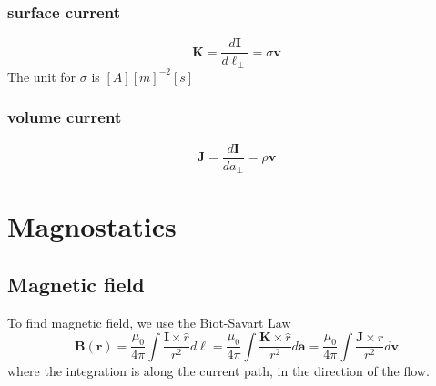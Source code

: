 \subsubsection{surface current}
\begin{equation}
    \mathbf{K}=\frac{d\mathbf{I}}{d\ell_\perp}=\sigma \mathbf{v}
\end{equation}
The unit for $\sigma$ is $[A][m]^{-2}[s]$
\subsubsection{volume current}
\begin{equation}
    \mathbf{J}=\frac{d\mathbf{I}}{da_\perp}=\rho \mathbf{v}
\end{equation}

\section{Magnostatics}
\subsection{Magnetic field}
To find magnetic field, we use the Biot-Savart Law
\begin{equation}
    \mathbf{B(r)}=\frac{\mu_0}{4\pi} \int \frac{\mathbf{I}\times \hat{r}}{r^2}d\ell=\frac{\mu_0}{4\pi} \int \frac{\mathbf{K}\times \hat{r}}{r^2}d\mathbf{a}=\frac{\mu_0}{4\pi}\int \frac{\mathbf{J}\times \hat{r}}{r^2}d\mathbf{v}
\end{equation}
where the integration is along the current path, in the direction of the flow. 

